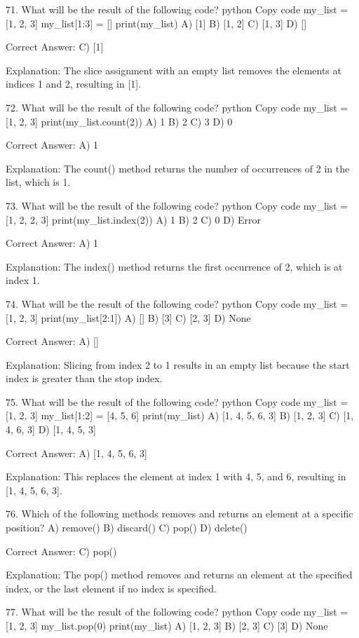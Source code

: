 71. What will be the result of the following code?
python
Copy code
my_list = [1, 2, 3]
my_list[1:3] = []
print(my_list)
A) [1]
B) [1, 2]
C) [1, 3]
D) []

Correct Answer: C) [1]

Explanation:
The slice assignment with an empty list removes the elements at indices 1 and 2, resulting in [1].

72. What will be the result of the following code?
python
Copy code
my_list = [1, 2, 3]
print(my_list.count(2))
A) 1
B) 2
C) 3
D) 0

Correct Answer: A) 1

Explanation:
The count() method returns the number of occurrences of 2 in the list, which is 1.

73. What will be the result of the following code?
python
Copy code
my_list = [1, 2, 2, 3]
print(my_list.index(2))
A) 1
B) 2
C) 0
D) Error

Correct Answer: A) 1

Explanation:
The index() method returns the first occurrence of 2, which is at index 1.

74. What will be the result of the following code?
python
Copy code
my_list = [1, 2, 3]
print(my_list[2:1])
A) []
B) [3]
C) [2, 3]
D) None

Correct Answer: A) []

Explanation:
Slicing from index 2 to 1 results in an empty list because the start index is greater than the stop index.

75. What will be the result of the following code?
python
Copy code
my_list = [1, 2, 3]
my_list[1:2] = [4, 5, 6]
print(my_list)
A) [1, 4, 5, 6, 3]
B) [1, 2, 3]
C) [1, 4, 6, 3]
D) [1, 4, 5, 3]

Correct Answer: A) [1, 4, 5, 6, 3]

Explanation:
This replaces the element at index 1 with 4, 5, and 6, resulting in [1, 4, 5, 6, 3].

76. Which of the following methods removes and returns an element at a specific position?
A) remove()
B) discard()
C) pop()
D) delete()

Correct Answer: C) pop()

Explanation:
The pop() method removes and returns an element at the specified index, or the last element if no index is specified.

77. What will be the result of the following code?
python
Copy code
my_list = [1, 2, 3]
my_list.pop(0)
print(my_list)
A) [1, 2, 3]
B) [2, 3]
C) [3]
D) None

